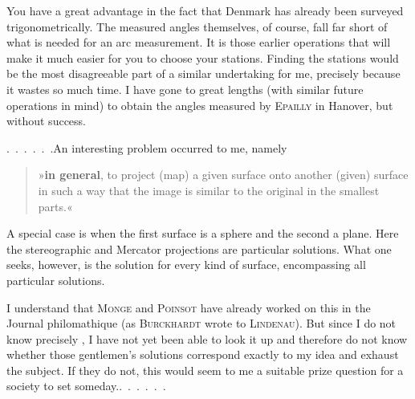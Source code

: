 \par\noindent\hspace*{\parindent}You have a great advantage in the fact that Denmark has already been surveyed trigonometrically. The measured angles themselves, of course, fall far short of what is needed for an arc measurement. It is those earlier operations that will make it much easier for you to choose your stations. Finding the stations would be the most disagreeable part of a similar undertaking for me, precisely because it wastes so much time. I have gone to great lengths (with similar future operations in mind) to obtain the angles measured by \textsc{Epailly} in Hanover, but without success.

\par\noindent\hspace*{\parindent}.\ .\ .\ .\ .\ .\quad An interesting problem occurred to me, namely
\begin{quote}
\noindent»\textbf{in general}, to project (map) a given surface onto another (given) surface in such a way that the image is similar to the original in the smallest parts.«
\end{quote}
\par\noindent\hspace*{\parindent}A special case is when the first surface is a sphere and the second a plane. Here the stereographic and Mercator projections are particular solutions. What one seeks, however, is the  solution for every kind of surface, encompassing all particular solutions.

\par\noindent\hspace*{\parindent}I understand that \textsc{Monge} and \textsc{Poinsot} have already worked on this in the Journal philomathique (as \textsc{Burckhardt} wrote to \textsc{Lindenau}). But since I do not know precisely , I have not yet been able to look it up and therefore do not know whether those gentlemen's solutions correspond exactly to my idea and exhaust the subject. If they do not, this would seem to me a suitable prize question for a society to set someday.\quad.\ .\ .\ .\ .\ .
